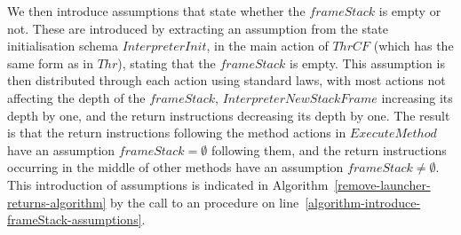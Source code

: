 We then introduce assumptions that state whether the $frameStack$ is
empty or not.
These are introduced by extracting an assumption from the state
initialisation schema $InterpreterInit$, in the main action of $ThrCF$
(which has the same form as in $Thr$), stating that the $frameStack$
is empty.
This assumption is then distributed through each action using standard
laws, with most actions not affecting the depth of the $frameStack$,
$InterpreterNewStackFrame$ increasing its depth by one, and the return
instructions decreasing its depth by one.
The result is that the return instructions following the method
actions in $ExecuteMethod$ have an assumption $frameStack = \emptyset$
following them, and the return instructions occurring in the middle of
other methods have an assumption $frameStack \neq \emptyset$.
This introduction of assumptions is indicated in
Algorithm~\ref{remove-launcher-returns-algorithm} by the call to an
 procedure on
line~\ref{algorithm-introduce-frameStack-assumptions}.


